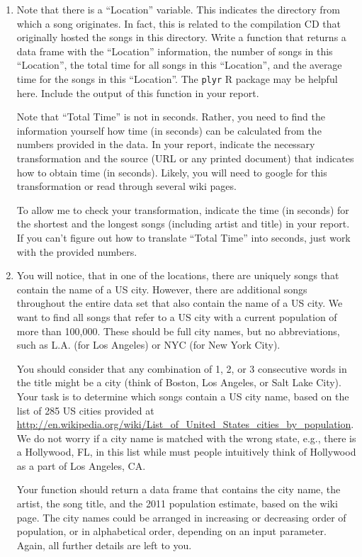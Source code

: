 \documentclass[11pt]{article}
\begin{document}
\begin{enumerate}
\item Note that there is a ``Location'' variable. This indicates the directory
from which a song originates. In fact, this is related to the compilation CD
that originally hosted the songs in this directory.  Write a function
that returns a data frame with the ``Location'' information,
the number of songs in this ``Location'',   the total time
for all songs in this ``Location'', and the average time
for the songs in this ``Location''. The {\tt plyr}
R package may be helpful here. Include the output of
this function in your report.

Note that ``Total Time'' is not in seconds. Rather,  you need
to find the information yourself how time (in seconds) can be
calculated from the numbers provided in the data.
In your report, indicate the necessary transformation
and the source (URL or any printed document) that indicates
how to obtain time (in seconds). Likely, you will need to
google for this transformation or read through several wiki pages.

To allow me to check your transformation, indicate the time (in seconds)
for the shortest and the longest songs (including artist and title) in your report. If you can't figure out how to
translate ``Total Time'' into seconds, just work with the 
provided numbers.


\item You will notice, that in one of the locations, there are uniquely songs
that contain the name of a US city. However, there are additional songs
throughout the entire data set that also contain the name of a US city.
We want to find all songs that refer to a US city with a current
population of more than 100,000. These should be full city names,
but no abbreviations, such as L.A. (for Los Angeles)
or NYC (for New York City). 

You should consider that any combination of 1, 2, or 3 consecutive
words in the title might be a city (think of Boston, Los Angeles,
or Salt Lake City). Your task is to determine which songs contain
a US city name, based on the list of 285 US cities provided at
\url{http://en.wikipedia.org/wiki/List_of_United_States_cities_by_population}.
We do not worry if a city name is matched with the wrong state,
e.g., there is a Hollywood, FL, in this list while must people intuitively
think of Hollywood as a part of Los Angeles, CA.

Your function should return a data frame that contains the city name,
the artist, the song title, and the 2011 population estimate, based on the wiki page.
The city names could be arranged in increasing or decreasing order of population,
or in alphabetical order, depending on an input parameter.
Again, all further details are left to you.


\end{enumerate}
\end{document}
